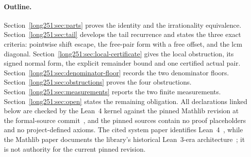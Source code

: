 \paragraph{Outline.}
Section~\ref{long251:sec:parts} proves the identity and the irrationality equivalence.
Section~\ref{long251:sec:tail} develops the tail recurrence and states the three exact
criteria: pointwise shift escape, the free-pair form with a free offset, and
the lcm diagonal.  Section~\ref{long251:sec:local-certificate} gives the local
obstruction, its signed normal form, the explicit remainder bound and one
certified actual pair.  Section~\ref{long251:sec:denominator-floor} records the two
denominator floors.  Section~\ref{long251:sec:obstructions} proves the four
obstructions.  Section~\ref{long251:sec:measurements} reports the two finite
measurements.  Section~\ref{long251:sec:open} states the remaining obligation.  All
declarations linked below are checked by the Lean~4 kernel against the pinned
Mathlib revision at the formal-source commit~\commitshort, and the pinned
sources contain no proof placeholders and no project-defined axioms.  The
cited system paper identifies Lean~4~\cite[abstract and \S1,
pp.~625--626]{lean4}, while the Mathlib paper documents the library's
historical Lean~3-era architecture~\cite[abstract and \S1.1, p.~367]{mathlib};
it is not authority for the current pinned revision.

\statusboundary

